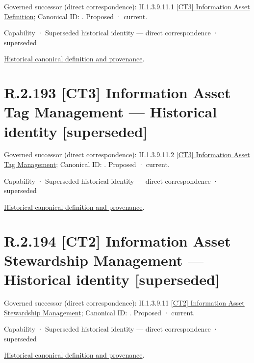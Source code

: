 {\small Governed successor (direct correspondence): II.1.3.9.11.1 \hyperref[element:05c58b2ccfcc45e9a6c70d9a569c4f61]{[CT3] Information Asset Definition}; Canonical ID: \texttt{}. Proposed · current.}\par
\label{element:166a22463d2c4534bda7ae31273398b6}
{\small Capability · Superseded historical identity — direct correspondence · superseded}\par
\href{../../../../continuum/strategy/capability/166a22463d2c4534bda7ae31273398b6.md}{Historical canonical definition and provenance}.\par
\section*{R.2.193 [CT3] Information Asset Tag Management — Historical identity [superseded]}
\label{navigation:R.2.193}

{\small Governed successor (direct correspondence): II.1.3.9.11.2 \hyperref[element:df27c3ba6e164e56af7bff4e1eb1954a]{[CT3] Information Asset Tag Management}; Canonical ID: \texttt{}. Proposed · current.}\par
\label{element:ae44a4ee78414d1098814315793bd751}
{\small Capability · Superseded historical identity — direct correspondence · superseded}\par
\href{../../../../continuum/strategy/capability/ae44a4ee78414d1098814315793bd751.md}{Historical canonical definition and provenance}.\par
\section*{R.2.194 [CT2] Information Asset Stewardship Management — Historical identity [superseded]}
\label{navigation:R.2.194}

{\small Governed successor (direct correspondence): II.1.3.9.11 \hyperref[element:5bac15316d8d4f4db6e7a253f1acfbe3]{[CT2] Information Asset Stewardship Management}; Canonical ID: \texttt{}. Proposed · current.}\par
\label{element:cee085c690314802851de71f4741d8db}
{\small Capability · Superseded historical identity — direct correspondence · superseded}\par
\href{../../../../continuum/strategy/capability/cee085c690314802851de71f4741d8db.md}{Historical canonical definition and provenance}.\par
